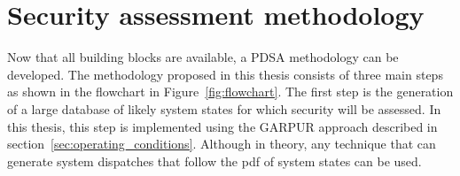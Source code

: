 \section{Security assessment methodology}
\label{sec:PDSA_methodology}

Now that all building blocks are available, a PDSA methodology can be developed. The methodology proposed in this thesis consists of three main steps as shown in the flowchart in Figure~\ref{fig:flowchart}. The first step is the generation of a large database of likely system states for which security will be assessed. In this thesis, this step is implemented using the GARPUR approach described in section~\ref{sec:operating_conditions}. Although in theory, any technique that can generate system dispatches that follow the pdf of system states can be used.



